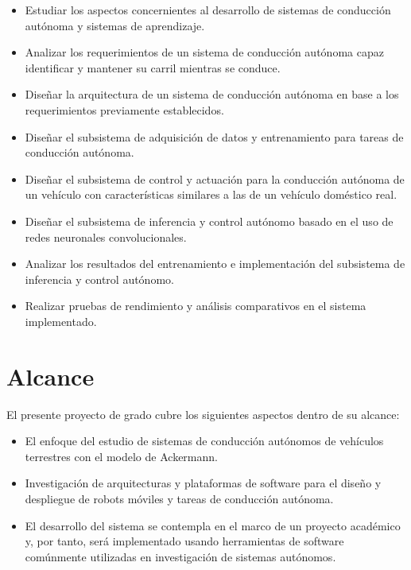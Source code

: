 \begin{itemize}

    \item Estudiar los aspectos concernientes al desarrollo de sistemas de conducción autónoma y sistemas de aprendizaje.
    \item Analizar los requerimientos de un sistema de conducción autónoma capaz identificar y mantener su carril mientras se conduce.
    \item Diseñar la arquitectura de un sistema de conducción autónoma en base a los requerimientos previamente establecidos.
    \item Diseñar el subsistema de adquisición de datos y entrenamiento para tareas de conducción autónoma.
    \item Diseñar el subsistema de control y actuación para la conducción autónoma de un vehículo con características similares a las de un vehículo doméstico real.
    \item Diseñar el subsistema de inferencia y control autónomo basado en el uso de redes neuronales convolucionales.
    \item Analizar los resultados del entrenamiento e implementación del subsistema de inferencia y control autónomo.
    \item Realizar pruebas de rendimiento y análisis comparativos en el sistema implementado.

\end{itemize}


\section{Alcance}

El presente proyecto de grado cubre los siguientes aspectos dentro de su alcance:

\begin{itemize}
    \item El enfoque del estudio de sistemas de conducción autónomos de vehículos terrestres con el modelo de Ackermann.
    \item Investigación de arquitecturas y plataformas de software para el
    diseño y despliegue de robots móviles y tareas de conducción autónoma.
    \item El desarrollo del sistema se contempla en el marco de un proyecto académico 
    y, por tanto, será implementado usando herramientas de software comúnmente utilizadas en 
    investigación de sistemas autónomos.
\end{itemize}


